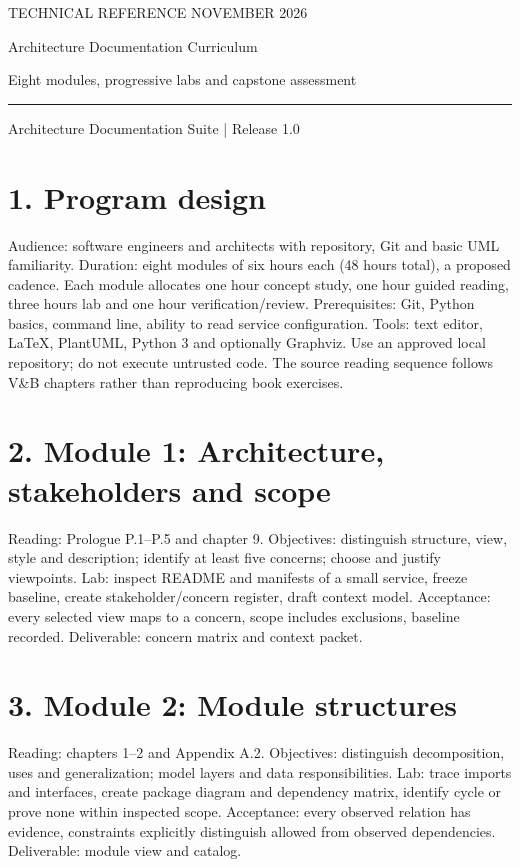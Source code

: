 \documentclass[11pt,letterpaper]{article}
\begin{document}
\thispagestyle{empty}
{\color{accent}\large TECHNICAL REFERENCE \hfill NOVEMBER 2026}\par\vspace{1.1cm}
{\color{ink}\LARGE\bfseries\raggedright Architecture Documentation Curriculum}\par\vspace{0.35cm}
{\Large Eight modules, progressive labs and capstone assessment}\par\vspace{0.55cm}
\rule{\textwidth}{0.7pt}\par\smallskip
{\small Architecture Documentation Suite | Release 1.0}\par\vspace{0.7cm}
\tableofcontents
\newpage
\section*{1. Program design}
Audience: software engineers and architects with repository, Git and basic UML familiarity. Duration: eight modules of six hours each (48 hours total), a proposed cadence. Each module allocates one hour concept study, one hour guided reading, three hours lab and one hour verification/review. Prerequisites: Git, Python basics, command line, ability to read service configuration. Tools: text editor, LaTeX, PlantUML, Python 3 and optionally Graphviz. Use an approved local repository; do not execute untrusted code. The source reading sequence follows V\&B chapters rather than reproducing book exercises.\par\smallskip
\section*{2. Module 1: Architecture, stakeholders and scope}
Reading: Prologue P.1--P.5 and chapter 9. Objectives: distinguish structure, view, style and description; identify at least five concerns; choose and justify viewpoints. Lab: inspect README and manifests of a small service, freeze baseline, create stakeholder/concern register, draft context model. Acceptance: every selected view maps to a concern, scope includes exclusions, baseline recorded. Deliverable: concern matrix and context packet.\par\smallskip
\section*{3. Module 2: Module structures}
Reading: chapters 1--2 and Appendix A.2. Objectives: distinguish decomposition, uses and generalization; model layers and data responsibilities. Lab: trace imports and interfaces, create package diagram and dependency matrix, identify cycle or prove none within inspected scope. Acceptance: every observed relation has evidence, constraints explicitly distinguish allowed from observed dependencies. Deliverable: module view and catalog.\par\smallskip
\end{document}
